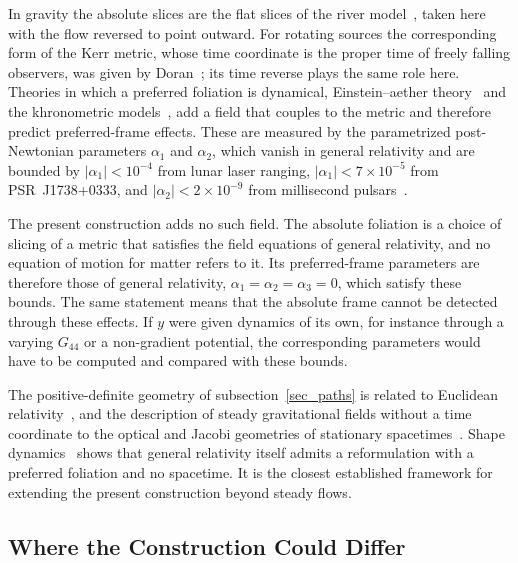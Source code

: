 \documentclass[anonymous]{iopjournal}
\begin{document}
In gravity the absolute slices are the flat slices of the river model~\cite{HamiltonLisle2008}, taken here with the flow reversed to point outward. For rotating sources the corresponding form of the Kerr metric, whose time coordinate is the proper time of freely falling observers, was given by Doran~\cite{Doran2000}; its time reverse plays the same role here. Theories in which a preferred foliation is dynamical, Einstein--aether theory~\cite{JacobsonMattingly2001} and the khronometric models~\cite{BlasPujolasSibiryakov2011}, add a field that couples to the metric and therefore predict preferred-frame effects. These are measured by the parametrized post-Newtonian parameters $\alpha_1$ and $\alpha_2$, which vanish in general relativity and are bounded by $|\alpha_1|<10^{-4}$ from lunar laser ranging, $|\alpha_1|<7\times10^{-5}$ from PSR~J1738+0333, and $|\alpha_2|<2\times10^{-9}$ from millisecond pulsars~\cite{Will2014}.

The present construction adds no such field. The absolute foliation is a choice of slicing of a metric that satisfies the field equations of general relativity, and no equation of motion for matter refers to it. Its preferred-frame parameters are therefore those of general relativity, $\alpha_1=\alpha_2=\alpha_3=0$, which satisfy these bounds. The same statement means that the absolute frame cannot be detected through these effects. If $y$ were given dynamics of its own, for instance through a varying $G_{44}$ or a non-gradient potential, the corresponding parameters would have to be computed and compared with these bounds.

The positive-definite geometry of subsection~\ref{sec_paths} is related to Euclidean relativity~\cite{Montanus2001,Almeida2001}, and the description of steady gravitational fields without a time coordinate to the optical and Jacobi geometries of stationary spacetimes~\cite{GibbonsZermelo2009,Gibbons2016Jacobi}. Shape dynamics~\cite{GomesGrybKoslowski2011} shows that general relativity itself admits a reformulation with a preferred foliation and no spacetime. It is the closest established framework for extending the present construction beyond steady flows.

\subsection{Where the Construction Could Differ}\label{sec_gamma_coscaling}
\end{document}
